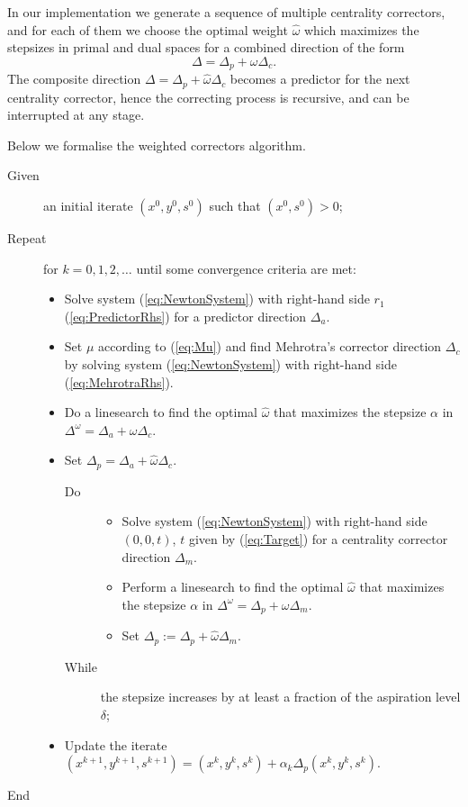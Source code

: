 
In our implementation we generate a sequence of multiple centrality 
correctors, and for each of them we choose the optimal weight 
$\hat \omega$ which maximizes the stepsizes in primal and dual spaces 
for a combined direction of the form
\[
  \Delta = \Delta_p + \omega \Delta_c.
\]
The composite direction $\Delta = \Delta_p + \hat \omega \Delta_c$ becomes
a predictor for the next centrality corrector, hence the correcting process
is recursive, and can be interrupted at any stage.

Below we formalise the weighted correctors algorithm.
\begin{description}
\item[Given] an initial iterate $(x^0,y^0,s^0)$ such that $(x^0, s^0) > 0$;
\item[Repeat] for $k=0,1,2,\ldots$ until some convergence criteria are met:
  \begin{itemize}
  \item Solve system (\ref{eq:NewtonSystem}) with right-hand side $r_1$
        (\ref{eq:PredictorRhs}) for a predictor direction $\Delta_a$.

  \item Set $\mu$ according to (\ref{eq:Mu}) and find Mehrotra's corrector 
        direction $\Delta_c$ by solving system (\ref{eq:NewtonSystem}) 
        with right-hand side (\ref{eq:MehrotraRhs}).

  \item Do a linesearch to find the optimal $\hat\omega$ that maximizes 
        the stepsize $\alpha$ in $\Delta^\omega = \Delta_a +\omega\Delta_c$.

  \item Set $\Delta_p = \Delta_a +\hat\omega\Delta_c$. 
    \begin{description}
    \item[Do]
      \begin{itemize}
      \item Solve system (\ref{eq:NewtonSystem}) with right-hand side
	$(0,0,t)$, $t$ given by (\ref{eq:Target}) for a centrality corrector
	direction $\Delta_m$.
      \item Perform a linesearch to find the optimal $\hat\omega$ that maximizes 
        the stepsize $\alpha$ in $\Delta^\omega = \Delta_p +\omega\Delta_m$.
      \item Set $\Delta_p := \Delta_p +\hat\omega\Delta_m$. 
	\end{itemize}
    \item[While] the stepsize increases by at least a fraction of the aspiration level $\delta$;
    \end{description}
  \item Update the iterate $(x^{k+1},y^{k+1},s^{k+1}) = (x^k,y^k,s^k) + \alpha_k\Delta_p (x^k,y^k,s^k).$
  \end{itemize}
\item[End]
\end{description}

